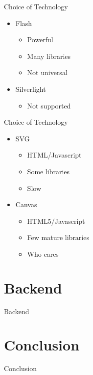 \documentclass{beamer}
\begin{document}
\begin{frame}{Choice of Technology}
  \begin{itemize}
    \item Flash
      \begin{itemize}
        \item Powerful
        \item Many libraries
        \item Not universal
      \end{itemize}
    \item Silverlight
      \begin{itemize}
        \item Not supported
      \end{itemize}
  \end{itemize}
\end{frame}
\begin{frame}{Choice of Technology}
  \begin{itemize}
    \item SVG
      \begin{itemize}
        \item HTML/Javascript
        \item Some libraries
        \item Slow
      \end{itemize}
    \item Canvas
      \begin{itemize}
        \item HTML5/Javascript
        \item Few mature libraries
        \item Who cares
      \end{itemize}
  \end{itemize}
\end{frame}

\section{Backend}
\begin{frame}{Backend}
\end{frame}

\section{Conclusion}
\begin{frame}{Conclusion}
\end{frame}
\end{document}
